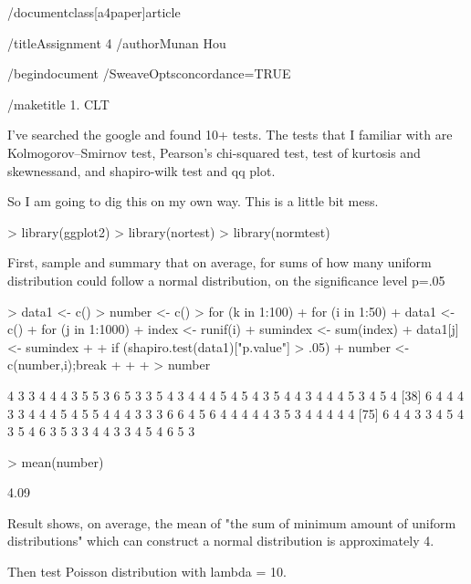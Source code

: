 /documentclass[a4paper]{article}

/title{Assignment 4}
/author{Munan Hou}

/begin{document}
/SweaveOpts{concordance=TRUE}

/maketitle{}
1. CLT

I've searched the google and found 10+ tests. The tests that I familiar with are Kolmogorov–Smirnov test, Pearson's chi-squared test, test of kurtosis and skewnessand, and shapiro-wilk test and qq plot.

So I am going to dig this on my own way. This is a little bit mess.

\begin{Schunk}
\begin{Sinput}
> library(ggplot2)
> library(nortest)
> library(normtest)
\end{Sinput}
\end{Schunk}

First, sample and summary that on average, for sums of how many uniform distribution could follow a normal distribution, on the significance level p=.05

\begin{Schunk}
\begin{Sinput}
> data1 <- c()
> number <- c()
> for (k in 1:100) {
+   for (i in 1:50) {
+     data1 <- c()
+     for (j in 1:1000) {
+       index <- runif(i)
+       sumindex <- sum(index)
+       data1[j] <- sumindex
+     }
+     if (shapiro.test(data1)["p.value"] > .05) {
+       number <- c(number,i);break
+     }
+   }
+ }
> number
\end{Sinput}
\begin{Soutput}
  [1] 4 3 3 4 4 4 3 5 5 3 6 5 3 3 5 4 3 4 4 4 5 4 5 4 3 5 4 4 3 4 4 4 5 3 4 5 4
 [38] 6 4 4 4 3 3 4 4 4 5 4 5 5 4 4 4 3 3 3 6 6 4 5 6 4 4 4 4 4 3 5 3 4 4 4 4 4
 [75] 6 4 4 3 3 4 5 4 3 5 4 6 3 5 3 3 4 4 3 3 4 5 4 6 5 3
\end{Soutput}
\begin{Sinput}
> mean(number)
\end{Sinput}
\begin{Soutput}
[1] 4.09
\end{Soutput}
\end{Schunk}

Result shows, on average, the mean of "the sum of minimum amount of uniform distributions" which can construct a normal distribution is approximately 4.

Then test Poisson distribution with lambda = 10.

